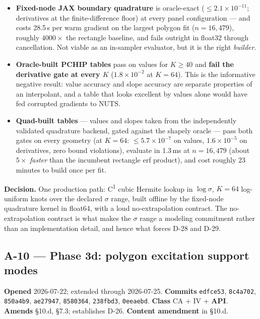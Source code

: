 \documentclass[
  10pt,
]{article}
\providecommand{\tightlist}{%
  \setlength{\itemsep}{0pt}\setlength{\parskip}{0pt}}
\begin{document}
\begin{itemize}
\tightlist
\item
  \textbf{Fixed-node JAX boundary quadrature} is oracle-exact (\(\leq 2.1 \times 10^{-11}\); derivatives at the finite-difference floor) at every panel configuration --- and costs 28.5\,s per warm gradient on the largest polygon fit (\(n = 16{,}479\)), roughly \(4000\times\) the rectangle baseline, and fails outright in float32 through cancellation. Not viable as an in-sampler evaluator, but it is the right \emph{builder}.
\item
  \textbf{Oracle-built PCHIP tables} pass on values for \(K \geq 40\) and \textbf{fail the derivative gate at every \(K\)} (\(1.8 \times 10^{-2}\) at \(K = 64\)). This is the informative negative result: value accuracy and slope accuracy are separate properties of an interpolant, and a table that looks excellent by values alone would have fed corrupted gradients to NUTS.
\item
  \textbf{Quad-built tables} --- values and slopes taken from the independently validated quadrature backend, gated against the shapely oracle --- pass both gates on every geometry (at \(K = 64\): \(\leq 5.7 \times 10^{-7}\) on values, \(1.6 \times 10^{-5}\) on derivatives, zero bound violations), evaluate in 1.3\,ms at \(n = 16{,}479\) (about \(5\times\) \emph{faster} than the incumbent rectangle erf product), and cost roughly 23 minutes to build once per fit.
\end{itemize}

\textbf{Decision.} One production path: C\textsuperscript{1} cubic Hermite lookup in \(\log \sigma\), \(K = 64\) log-uniform knots over the declared \(\sigma\) range, built offline by the fixed-node quadrature kernel in float64, with a loud no-extrapolation contract. The no-extrapolation contract is what makes the \(\sigma\) range a modeling commitment rather than an implementation detail, and hence what forces D-28 and D-29.

\hypertarget{a-10}{%
\subsection{A-10 --- Phase 3d: polygon excitation support modes}\label{a-10}}

\textbf{Opened} 2026-07-22; extended through 2026-07-25. \textbf{Commits} \texttt{edfce53}, \texttt{8c4a702}, \texttt{850a4b9}, \texttt{ae27947}, \texttt{8580364}, \texttt{238fbd3}, \texttt{0eeaebd}. \textbf{Class} CA + IV + \textbf{API}. \textbf{Amends} §10.d, §7.3; establishes D-26. \textbf{Content amendment} in §10.d.
\end{document}
